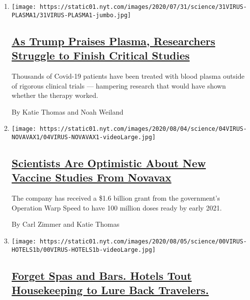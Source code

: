 \begin{enumerate}
\def\labelenumi{\arabic{enumi}.}
\item
  \texttt{[image: https://static01.nyt.com/images/2020/07/31/science/31VIRUS-PLASMA1/31VIRUS-PLASMA1-jumbo.jpg]}

  \hypertarget{as-trump-praises-plasma-researchers-struggle-to-finish-critical-studies}{%
  \subsection{\texorpdfstring{\href{/2020/08/04/health/trump-plasma.html}{As
  Trump Praises Plasma, Researchers Struggle to Finish Critical
  Studies}}{As Trump Praises Plasma, Researchers Struggle to Finish Critical Studies}}\label{as-trump-praises-plasma-researchers-struggle-to-finish-critical-studies}}

  Thousands of Covid-19 patients have been treated with blood plasma
  outside of rigorous clinical trials --- hampering research that would
  have shown whether the therapy worked.

  By Katie Thomas and Noah Weiland
\item
  \texttt{[image: https://static01.nyt.com/images/2020/08/04/science/04VIRUS-NOVAVAX1/04VIRUS-NOVAVAX1-videoLarge.jpg]}

  \hypertarget{scientists-are-optimistic-about-new-vaccine-studies-from-novavax}{%
  \subsection{\texorpdfstring{\href{/2020/08/04/health/covid-19-vaccine-novavax.html}{Scientists
  Are Optimistic About New Vaccine Studies From
  Novavax}}{Scientists Are Optimistic About New Vaccine Studies From Novavax}}\label{scientists-are-optimistic-about-new-vaccine-studies-from-novavax}}

  The company has received a \$1.6 billion grant from the government's
  Operation Warp Speed to have 100 million doses ready by early 2021.

  By Carl Zimmer and Katie Thomas
\item
  \texttt{[image: https://static01.nyt.com/images/2020/08/05/science/00VIRUS-HOTELS1b/00VIRUS-HOTELS1b-videoLarge.jpg]}

  \hypertarget{forget-spas-and-bars-hotels-tout-housekeeping-to-lure-back-travelers}{%
  \subsection{\texorpdfstring{\href{/2020/08/04/health/coronavirus-hotels-infect.html}{Forget
  Spas and Bars. Hotels Tout Housekeeping to Lure Back
  Travelers.}}{Forget Spas and Bars. Hotels Tout Housekeeping to Lure Back Travelers.}}\label{forget-spas-and-bars-hotels-tout-housekeeping-to-lure-back-travelers}}


\end{enumerate}
